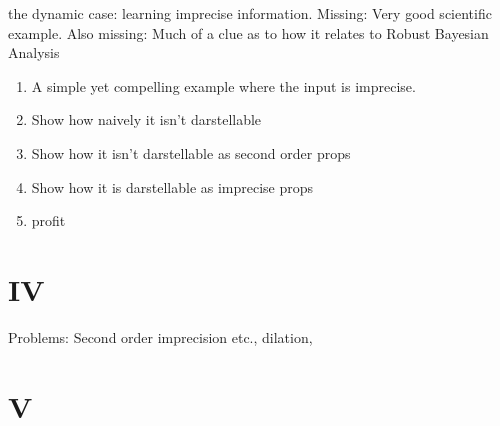 \documentclass[11pt, a4paper]{scrartcl}
\begin{document}
the dynamic case: learning imprecise information. Missing: Very good scientific example. Also missing: Much of a clue as to how it relates to Robust Bayesian Analysis
\begin{enumerate}[label=\roman{*}]
    \item A simple yet compelling example where the input is imprecise.
    \item Show how naively it isn't darstellable
    \item Show how it isn't darstellable as second order props
    \item Show how it is darstellable as imprecise props 
    \item profit
\end{enumerate}
\section{IV}

Problems: Second order imprecision etc., dilation, 
\section{V}

\begin{singlespacing}
\printbibliography{}
\end{singlespacing}
\end{document}

